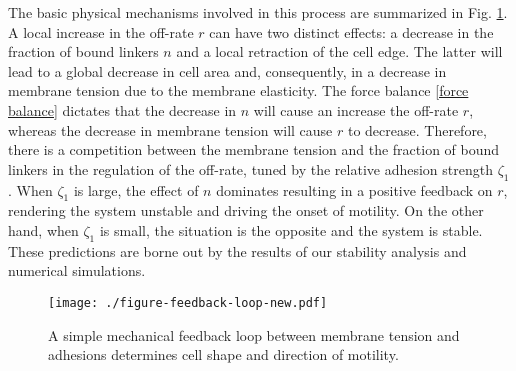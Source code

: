 \documentclass[12pt]{article}
\begin{document}
        The basic physical mechanisms involved in this process are summarized in Fig. \ref{fig:feedback loop}. A local increase in the off-rate $r$ can have two distinct effects: a decrease in the fraction of bound linkers $n$ and a local retraction of the cell edge. 
        The latter will lead to a global decrease in cell area and, consequently, in a decrease in membrane tension due to the membrane elasticity.
        The force balance \eqref{force balance} dictates that the decrease in $n$ will cause an increase the off-rate $r$, whereas the decrease in membrane tension will cause $r$ to decrease. 
        Therefore, there is a competition between the membrane tension and the fraction of bound linkers in the regulation of the off-rate, tuned by the relative adhesion strength $\zeta_1$. 
        When $\zeta_1$ is large, the effect of $n$ dominates resulting in a positive feedback on $r$, rendering the system unstable and driving the onset of motility.
        On the other hand, when $\zeta_1$ is small, the situation is the opposite and the system is stable.  
        These predictions are borne out by the results of our stability analysis and numerical simulations.
        
        \begin{figure}[t]
            \centering
            \texttt{[image: ./figure-feedback-loop-new.pdf]}
            \caption{A simple mechanical feedback loop between membrane tension and adhesions determines cell shape and direction of motility.} 
            \label{fig:feedback loop}
        \end{figure}
        
\end{document}
